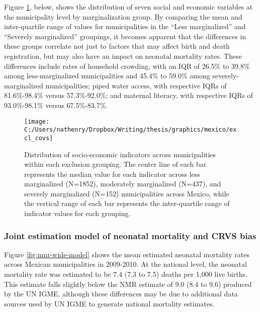 \documentclass[
]{article}
\begin{document}
Figure \ref{fig:excl-covs}, below, shows the distribution of seven social and economic variables at the municipality level by marginalization group. By comparing the mean and inter-quartile range of values for municipalities in the ``Less marginalized'' and ``Severely marginalized'' groupings, it becomes apparent that the differences in these groups correlate not just to factors that may affect birth and death registration, but may also have an impact on neonatal mortality rates. These differences include rates of household crowding, with an IQR of 26.5\% to 39.8\% among less-marginalized municipalities and 45.4\% to 59.0\% among severely-marginalized municipalities; piped water access, with respective IQRs of 81.6\%-98.4\% versus 57.3\%-92.0\%; and maternal literacy, with respective IQRs of 93.0\%-98.1\% versus 67.5\%-83.7\%.

\begin{figure}[!ht]

{\centering \texttt{[image: C:/Users/nathenry/Dropbox/Writing/thesis/graphics/mexico/excl\_covs]} 

}

\caption{Distribution of socio-economic indicators across municipalities within each exclusion grouping. The center line of each bar represents the median value for each indicator across less marginalized (N=1852), moderately marginalized (N=437), and severely marginalized (N=152) municipalities across Mexico, while the vertical range of each bar represents the inter-quartile range of indicator values for each grouping.}\label{fig:excl-covs}
\end{figure}

\hypertarget{joint-estimation-model-of-neonatal-mortality-and-crvs-bias}{%
\subsubsection{Joint estimation model of neonatal mortality and CRVS bias}\label{joint-estimation-model-of-neonatal-mortality-and-crvs-bias}}

Figure \ref{fig:nmr-wide-model} shows the mean estimated neonatal mortality rates across Mexican municipalities in 2009-2010. At the national level, the neonatal mortality rate was estimated to be 7.4 (7.3 to 7.5) deaths per 1,000 live births. This estimate falls slightly below the NMR estimate of 9.0 (8.4 to 9.6) produced by the UN IGME, although these differences may be due to additional data sources used by UN IGME to generate national mortality estimates.
\end{document}
